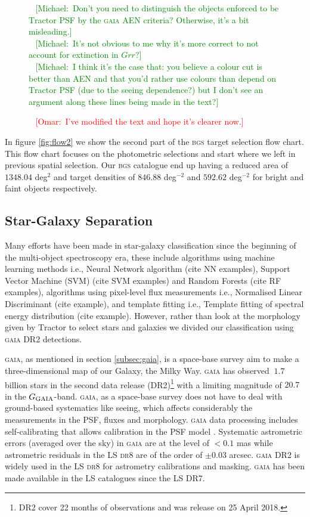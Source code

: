 \documentclass[fleqn,usenatbib]{mnras}
\newcommand{\mike}[1]{~\newline\noindent \textcolor{Green}{{ [Michael:~{#1}]\\}}}
\newcommand{\omar}[1]{~\newline\noindent \textcolor{red}{{ [Omar:~{#1}]\\}}}
\newcommand{\BGS}{\textsc{bgs}\xspace}
\newcommand{\DReight}{\textsc{dr8}\xspace}
\newcommand{\GAIA}{\textsc{gaia}\xspace}
\newcommand{\TRACTOR}{\textsc{T}ractor\xspace}
\begin{document}
\begin{figure}
    \mike{Don't you need to distinguish the objects enforced to be \TRACTOR PSF by the \GAIA AEN criteria?  Otherwise, it's a bit misleading.}
    \mike{It's not obvious to me why it's more correct to not account for extinction in $Grr$?}
    \mike{I think it's the case that:  you believe a colour cut is better than AEN and that you'd rather use colours than depend on \TRACTOR PSF (due to the seeing dependence?) but I don't see an argument along these lines being made in the text?}
    
\omar{I've modified the text and hope it's clearer now.}
    \label{fig:Grr-gz}
\end{figure}

In figure \ref{fig:flow2}  we show the second part of the \BGS target selection flow chart. This flow chart focuses on the photometric selections and start where we left in previous spatial selection. Our \BGS catalogue end up having a reduced area of $1348.04$ deg$^{2}$ and target densities of $846.88$ deg$^{-2}$ and $592.62$ deg$^{-2}$ for bright and faint objects respectively. 

\subsection{Star-Galaxy Separation}\label{subsec:star_galaxy}

Many efforts have been made in star-galaxy classification since the beginning of the multi-object spectroscopy era, these include algorithms using machine learning methods i.e., Neural Network algorithm (cite NN examples), Support Vector Machine (SVM) (cite SVM examples) and Random Forests (cite RF examples), algorithms using pixel-level flux measurements i.e., Normalised Linear Discriminant (cite example), and template fitting i.e., Template fitting of spectral energy distribution (cite example). However, rather than look at the morphology given by \TRACTOR to select stars and galaxies we divided our classification using \GAIA DR2 detections. 

\GAIA \citep{2016A&A...595A...1G}, as mentioned in section \ref{subsec:gaia}, is a space-base survey aim to make a three-dimensional map of our Galaxy, the Milky Way. \GAIA has observed $~1.7$ billion stars in the second data release (DR2)\footnote{DR2 cover 22 months of observations and was release on 25 April 2018.} with a limiting magnitude of $20.7$ in the $G_{\rm{GAIA}}$-band. \GAIA, as a space-base survey does not have to deal with ground-based systematics like seeing, which affects considerably the measurements in the PSF, fluxes and morphology. \GAIA data processing includes self-calibrating that allows calibration in the PSF model \citep{2016A&A...595A...1G}. Systematic astrometric errors (averaged over the sky) in \GAIA are at the level of $<0.1$ mas while astrometric residuals in the LS \DReight are of the order of $\pm 0.03$ arcsec. \GAIA DR2 is widely used in the LS \DReight for astrometry calibrations and masking. \GAIA has been made available in the LS catalogues since the LS DR7.
\end{document}
